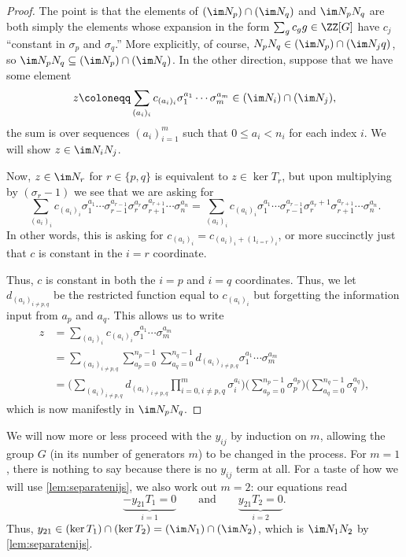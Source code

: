 \documentclass{article}
\numberwithin{equation}{section}
\begin{document}
\begin{proof}
	The point is that the elements of $(\im N_p)\cap(\im N_q)$ and $\im N_pN_q$ are both simply the elements whose expansion in the form $\sum_gc_gg\in\ZZ[G]$ have $c_j$ ``constant in $\sigma_p$ and $\sigma_q$.'' More explicitly, of course, $N_pN_q\in(\im N_p)\cap(\im N_jq)$, so $\im N_pN_q\subseteq(\im N_p)\cap(\im N_q)$. In the other direction, suppose that we have some element
	\[z\coloneqq\sum_{(a_i)_i}c_{(a_i)_i}\sigma_1^{a_1}\cdots\sigma_m^{a_m}\in(\im N_i)\cap(\im N_j),\]
	the sum is over sequences $(a_i)_{i=1}^m$ such that $0\le a_i<n_i$ for each index $i$. We will show $z\in\im N_iN_j$.
	
	Now, $z\in\im N_r$ for $r\in\{p,q\}$ is equivalent to $z\in\ker T_r$, but upon multiplying by $(\sigma_r-1)$ we see that we are asking for
	\[\sum_{(a_i)_i}c_{(a_i)_i}\sigma_1^{a_1}\cdots\sigma_{r-1}^{a_{r-1}}\sigma_r^{a_r}\sigma_{r+1}^{a_{r+1}}\cdots\sigma_n^{a_n}=\sum_{(a_i)_i}c_{(a_i)_i}\sigma_1^{a_1}\cdots\sigma_{r-1}^{a_{r-1}}\sigma_r^{a_r+1}\sigma_{r+1}^{a_{r+1}}\cdots\sigma_n^{a_n}.\]
	In other words, this is asking for $c_{(a_i)_i}=c_{(a_i)_i+(1_{i=r})_i}$, or more succinctly just that $c$ is constant in the $i=r$ coordinate.

	Thus, $c$ is constant in both the $i=p$ and $i=q$ coordinates. Thus, we let $d_{(a_i)_{i\ne p,q}}$ be the restricted function equal to $c_{(a_i)_i}$ but forgetting the information input from $a_p$ and $a_q$. This allows us to write
	\begin{align*}
		z &= \sum_{(a_i)_i}c_{(a_i)_i}\sigma_1^{a_1}\cdots\sigma_m^{a_m} \\
		&= \sum_{(a_i)_{i\ne p,q}}\sum_{a_p=0}^{n_p-1}\sum_{a_q=0}^{n_q-1}d_{(a_i)_{i\ne p,q}}\sigma_1^{a_1}\cdots\sigma_m^{a_m} \\
		&= \Bigg(\sum_{(a_i)_{i\ne p,q}}d_{(a_i)_{i\ne p,q}}\prod_{i=0,i\ne p,q}^m\sigma_i^{a_i}\Bigg)\Bigg(\sum_{a_p=0}^{n_p-1}\sigma_p^{a_p}\Bigg)\Bigg(\sum_{a_q=0}^{n_q-1}\sigma_q^{a_q}\Bigg),
	\end{align*}
	which is now manifestly in $\im N_pN_q$.
\end{proof}
We will now more or less proceed with the $y_{ij}$ by induction on $m$, allowing the group $G$ (in its number of generators $m$) to be changed in the process. For $m=1$, there is nothing to say because there is no $y_{ij}$ term at all. For a taste of how we will use \autoref{lem:separatenijs}, we also work out $m=2$: our equations read
\[\underbrace{-y_{21}T_1=0}_{i=1}\qquad\text{and}\qquad\underbrace{y_{21}T_2=0}_{i=2}.\]
Thus, $y_{21}\in(\ker T_1)\cap(\ker T_2)=(\im N_1)\cap(\im N_2)$, which is $\im N_1N_2$ by \autoref{lem:separatenijs}.
\end{document}
